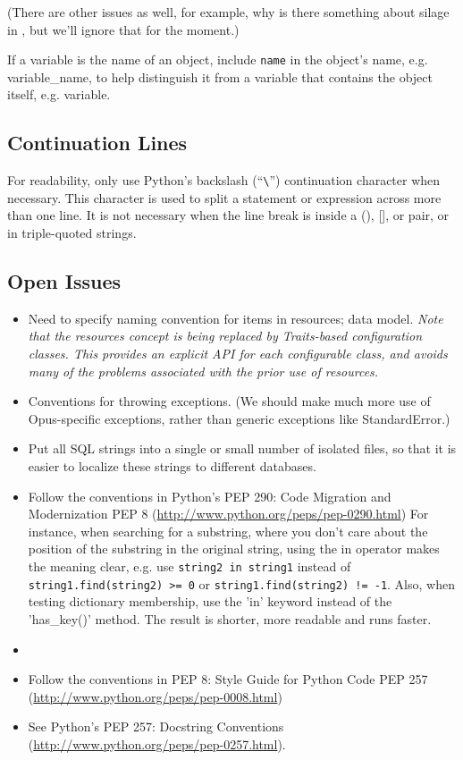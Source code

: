 (There are other issues as well, for example, why is there something about
silage in , but we'll ignore that for the moment.)

If a variable is the name of an object, include \verb|name| in the object's
name, e.g. variable_name, to help distinguish it from a variable that contains
the object itself, e.g. variable.

\subsection{Continuation Lines}

For readability, only use Python's backslash (``\verb|\|'') continuation
character when necessary.  This character is used to split a statement or
expression across more than one line.  It is not necessary when the line
break is inside a (), [], or {} pair, or in triple-quoted strings.

\subsection{Open Issues}

\begin{itemize}

\item Need to specify naming convention for items in resources; data model.
\emph{Note that the resources concept is being replaced by
Traits-based configuration classes.  This provides an explicit API
for each configurable class, and avoids many of the problems
associated with the prior use of resources.}

\item Conventions for throwing exceptions.  (We should make much more use of
Opus-specific exceptions, rather than generic exceptions like StandardError.)

\item Put all SQL strings into a single or small number of
isolated files, so that it is easier to localize these strings to different
databases.

\item Follow the conventions in Python's PEP 290: Code
Migration and Modernization PEP 8
(\url{http://www.python.org/peps/pep-0290.html}) For instance, when
searching for a substring, where you don't care about the position of the
substring in the original string, using the in operator makes the meaning
clear, e.g. use \verb|string2 in string1| instead of
\verb|string1.find(string2) >= 0| or \verb|string1.find(string2) != -1|.  Also,
when testing dictionary membership, use the 'in' keyword instead of the
'has_key()' method. The result is shorter, more readable and runs faster.\item

\item Follow the conventions in PEP 8: Style Guide for Python Code
PEP 257 (\url{http://www.python.org/peps/pep-0008.html})

\item See Python's PEP 257: Docstring Conventions
(\url{http://www.python.org/peps/pep-0257.html}).

\end{itemize}


